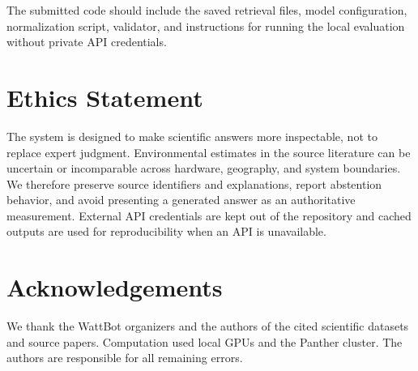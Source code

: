 \documentclass[11pt]{article}
\begin{document}
The submitted code should include the saved retrieval files, model configuration, normalization script, validator, and instructions for running the local evaluation without private API credentials.

\section*{Ethics Statement}
The system is designed to make scientific answers more inspectable, not to replace expert judgment. Environmental estimates in the source literature can be uncertain or incomparable across hardware, geography, and system boundaries. We therefore preserve source identifiers and explanations, report abstention behavior, and avoid presenting a generated answer as an authoritative measurement. External API credentials are kept out of the repository and cached outputs are used for reproducibility when an API is unavailable.

\section*{Acknowledgements}
We thank the WattBot organizers and the authors of the cited scientific datasets and source papers. Computation used local GPUs and the Panther cluster. The authors are responsible for all remaining errors.



\end{document}

